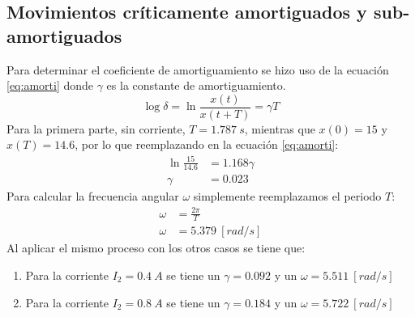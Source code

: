 \documentclass[spanish,notitlepage,letterpaper, 12pt]{article}
\begin{document}
\subsection{Movimientos críticamente amortiguados y sub-amortiguados}
Para determinar el coeficiente de amortiguamiento se hizo uso de la ecuación \eqref{eq:amorti} donde $\gamma$ es la constante de amortiguamiento.
\begin{equation}\label{eq:amorti}
    \log{\delta}=\ln{\frac{x(t)}{x(t+T)}}=\gamma T
\end{equation}
Para la primera parte, sin corriente, $T=1.787\ s$, mientras que $x(0)=15$ y $x(T)=14.6$, por lo que reemplazando en la ecuación \eqref{eq:amorti}:
\begin{align*}
    \ln{\frac{15}{14.6}}&=1.168\gamma\\
    \gamma&=0.023
\end{align*}
Para calcular la frecuencia angular $\omega$ simplemente reemplazamos el periodo $T$:
\begin{align*}
    \omega&=\frac{2\pi}{T}\\
    \omega&=5.379\ [rad/s]
\end{align*}
Al aplicar el mismo proceso con los otros casos se tiene que:
\begin{enumerate}
    \item Para la corriente $I_2=0.4\ A$ se tiene un $\gamma=0.092$ y un $\omega=5.511\ [rad/s]$
    \item Para la corriente $I_2=0.8\ A$ se tiene un $\gamma=0.184$ y un $\omega=5.722\ [rad/s]$
\end{enumerate}
\end{document}
